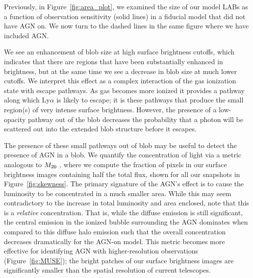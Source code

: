 Previously, in Figure~\ref{fig:area_plot}, we examined the size of our model LABs as a function of observation sensitivity (solid lines) in a fiducial model that did not have AGN on.
We now turn to the dashed lines in the same figure where we have included AGN.

We see an enhancement of blob size at high surface brightness cutoffs, which indicates that there are regions that have been substantially enhanced in brightness, but at the same time we see a decrease in blob size at much lower cutoffs.
We interpret this effect as a complex interaction of the gas ionization state with escape pathways.
As gas becomes more ionized it provides a pathway along which Ly$\alpha$ is likely to escape; it is these pathways that produce the small region(s) of very intense surface brightness.
However, the presence of a low-opacity pathway out of the blob decreases the probability that a photon will be scattered out into the extended blob structure before it escapes.

The presence of these small pathways out of blob may be useful to detect the presence of AGN in a blob.
We quantify the concentration of light via a metric analogous to $M_{\rm 20}$ \citep{Lotz2004}, where we compute the fraction of pixels in our surface brightness images containing half the total flux, shown for all our snapshots in Figure~\ref{fig:skewness}.
The primary signature of the AGN's effect is to cause the luminosity to be concentrated in a much smaller area.
While this may seem contradictory to the increase in total luminosity and area enclosed, note that this is a {\it relative} concentration.
That is, while the diffuse emission is still significant, the central emission in the ionized bubble surrounding the AGN dominates when compared to this diffuse halo emission such that the overall concentration decreases dramatically for the AGN-on model.
This metric becomes more effective for identifying AGN with higher-resolution observations (Figure~\ref{fig:MUSE}); the bright patches of our surface brightness images are significantly smaller than the spatial resolution of current telescopes.

